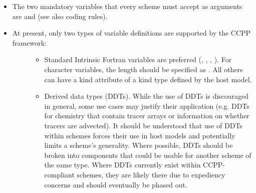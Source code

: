 \documentclass[letterpaper,10pt,english]{sphinxmanual}
\begin{document}
\begin{sphinxVerbatim}[commandchars=\\\{\}]
\end{sphinxVerbatim}
\begin{itemize}
\item {} 
The two mandatory variables that every scheme must accept as  arguments are
 and  (see also coding rules).

\item {} \begin{description}
\item[{At present, only two types of variable definitions are supported by the CCPP framework:}] \leavevmode\begin{itemize}
\item {} 
Standard Intrinsic Fortran variables are preferred (, , , ).
For character variables, the length should be specified as . All others can have a kind attribute
of a kind type defined by the host model.

\item {} 
Derived data types (DDTs). While the use of DDTs is discouraged in general, some use cases may
justify their application (e.g. DDTs for chemistry that contain tracer arrays or information on
whether tracers are advected). It should be understood that use of DDTs within schemes
forces their use in host models and potentially limits a scheme’s generality. Where possible,
DDTs should be broken into components that could be usable for another scheme of the same type.
Where DDTs currently exist within CCPP-compliant schemes, they are likely there due to expediency
concerns and should eventually be phased out.


\end{itemize}
\end{description}
\end{itemize}
\end{document}
